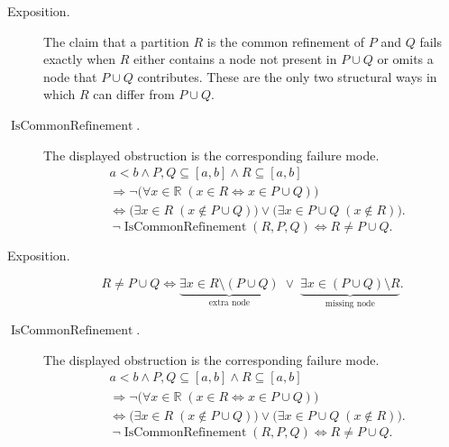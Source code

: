 \begin{remark*}
\begin{description}
  \item[Exposition.]
The claim that a partition $R$ is the common refinement of $P$ and $Q$ fails exactly when $R$ either contains a node not present in $P \cup Q$ or omits a node that $P \cup Q$ contributes. These are the only two structural ways in which $R$ can differ from $P \cup Q$.


  \item[\(\operatorname{IsCommonRefinement}.\)]
  The displayed obstruction is the corresponding failure mode.
  \[
\begin{aligned}
&a<b\land P,Q\subseteq [a,b]\land R\subseteq [a,b]\\
&\Longrightarrow
\neg\bigl(\forall x\in\mathbb{R}\;(x\in R\Longleftrightarrow x\in P\cup Q)\bigr)\\
&\Longleftrightarrow
\bigl(\exists x\in R\;(x\notin P\cup Q)\bigr)
\lor
\bigl(\exists x\in P\cup Q\;(x\notin R)\bigr).
\end{aligned}
  \]
  \[
\neg \operatorname{IsCommonRefinement}(R,P,Q) \Longleftrightarrow R \ne P \cup Q.
  \]
\end{description}
\end{remark*}

\begin{remark*}
\begin{description}
  \item[Exposition.]
\[
R \ne P \cup Q
\Longleftrightarrow
\underbrace{\exists x \in R \setminus (P \cup Q)}_{\text{extra node}}
\;\lor\;
\underbrace{\exists x \in (P \cup Q) \setminus R}_{\text{missing node}}.
\]


  \item[\(\operatorname{IsCommonRefinement}.\)]
  The displayed obstruction is the corresponding failure mode.
  \[
\begin{aligned}
&a<b\land P,Q\subseteq [a,b]\land R\subseteq [a,b]\\
&\Longrightarrow
\neg\bigl(\forall x\in\mathbb{R}\;(x\in R\Longleftrightarrow x\in P\cup Q)\bigr)\\
&\Longleftrightarrow
\bigl(\exists x\in R\;(x\notin P\cup Q)\bigr)
\lor
\bigl(\exists x\in P\cup Q\;(x\notin R)\bigr).
\end{aligned}
  \]
  \[
\neg \operatorname{IsCommonRefinement}(R,P,Q) \Longleftrightarrow R \ne P \cup Q.
  \]
\end{description}
\end{remark*}


